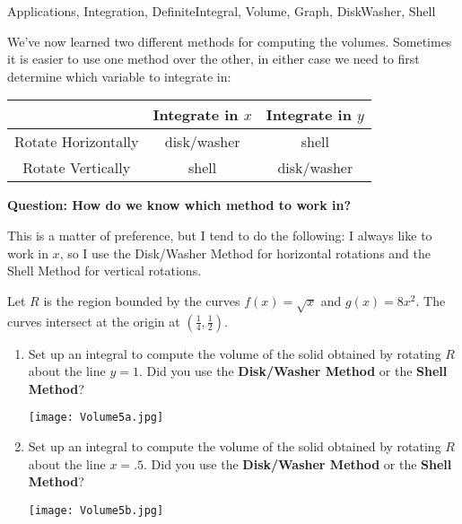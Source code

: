 
\begin{tagblock}{Applications, Integration, DefiniteIntegral, Volume, Graph, DiskWasher, Shell}
\begin{question}
	


We've now learned two different methods for computing the volumes.   Sometimes it is easier to use one method over the other, in either case we need to first determine which variable to integrate in:

\begin{center}
\begin{tabular}{ |c| c | c|} \hline
& Integrate in $x$ & Integrate in $y$ \\ \hline
Rotate Horizontally & disk/washer & shell \\ \hline
Rotate Vertically & shell & disk/washer \\ \hline 
\end{tabular}
\end{center}

\textbf{Question: How do we know which method to work in?}

This is a matter of preference, but I tend to do the following:  I always like to work in $x$, so I use the Disk/Washer Method for horizontal rotations and the Shell Method for vertical rotations.

\bigskip

Let $R$ is the region bounded by the curves $f(x) =\sqrt{x}$ and $g(x) = 8x^2$. The curves intersect at the origin at $(\frac{1}{4}, \frac{1}{2})$.
\begin{enumerate}
\item Set up an integral to compute the volume of the solid obtained by rotating $R$ about the line $y=1$.  Did you use the \textbf{Disk/Washer Method} or the \textbf{Shell Method}?

\texttt{[image: Volume5a.jpg]}

\vspace{1in}
\item Set up an integral to compute the volume of the solid obtained by rotating $R$ about the line $x=.5$.  Did you use the \textbf{Disk/Washer Method} or the \textbf{Shell Method}?

\texttt{[image: Volume5b.jpg]}

\vspace{1in}
\end{enumerate}





\end{question}
\end{tagblock}
